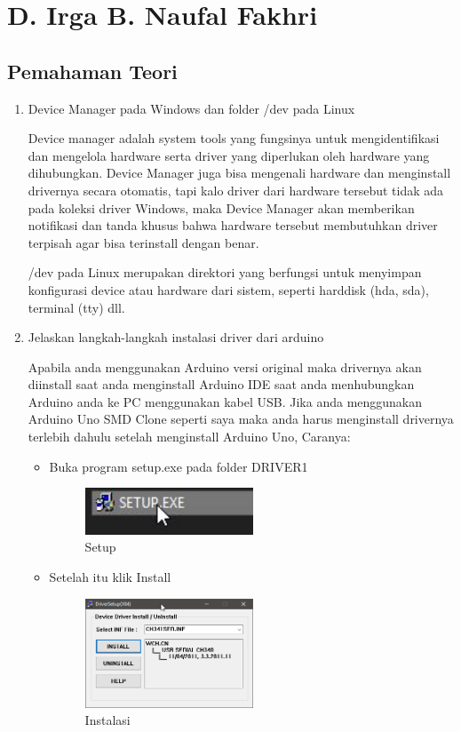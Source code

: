 ﻿\section{D. Irga B. Naufal Fakhri}
\subsection{Pemahaman Teori}
\begin{enumerate}
\item Device Manager pada Windows dan folder /dev pada Linux

Device manager adalah system tools yang fungsinya untuk mengidentifikasi dan mengelola hardware serta driver yang diperlukan oleh hardware yang dihubungkan. Device Manager juga bisa mengenali hardware dan menginstall drivernya secara otomatis, tapi kalo driver dari hardware tersebut tidak ada pada koleksi driver Windows, maka Device Manager akan memberikan notifikasi dan tanda khusus bahwa hardware tersebut membutuhkan driver terpisah agar bisa terinstall dengan benar.

/dev pada Linux merupakan direktori yang berfungsi untuk menyimpan konfigurasi device atau hardware dari sistem, seperti harddisk (hda, sda), terminal (tty) dll.

\item Jelaskan langkah-langkah instalasi driver dari arduino

Apabila anda menggunakan Arduino versi original maka drivernya akan diinstall saat anda menginstall Arduino IDE saat anda menhubungkan Arduino anda ke PC menggunakan kabel USB. Jika anda menggunakan Arduino Uno SMD Clone seperti saya maka anda harus menginstall drivernya terlebih dahulu setelah menginstall Arduino Uno, Caranya:
	\begin{itemize}
	\item Buka program setup.exe pada folder DRIVER1
	\begin{figure}[ht!]
		\includegraphics[width=5cm]{figures/5/1174066/0.jpg}
		\centering
		\caption{Setup}
	\end{figure}
	
	\item Setelah itu klik Install
	\begin{figure}[ht!]
		\includegraphics[width=5cm]{figures/5/1174066/1.png}
		\centering
		\caption{Instalasi}
	\end{figure}


\end{itemize}
\end{enumerate}
